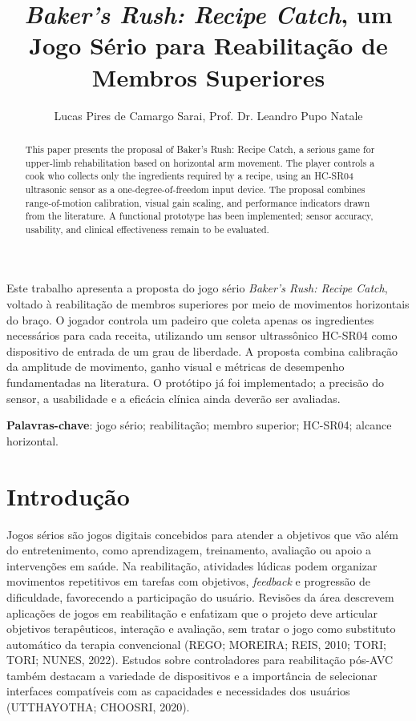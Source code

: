\documentclass[12pt]{article}
\title{\textit{Baker's Rush: Recipe Catch}, um Jogo Sério para Reabilitação de Membros Superiores}
\author{Lucas Pires de Camargo Sarai\inst{1}, Prof. Dr. Leandro Pupo Natale\inst{1}}
\begin{document}
\maketitle

\begin{abstract}
This paper presents the proposal of Baker's Rush: Recipe Catch, a serious game for upper-limb rehabilitation based on horizontal arm movement. The player controls a cook who collects only the ingredients required by a recipe, using an HC-SR04 ultrasonic sensor as a one-degree-of-freedom input device. The proposal combines range-of-motion calibration, visual gain scaling, and performance indicators drawn from the literature. A functional prototype has been implemented; sensor accuracy, usability, and clinical effectiveness remain to be evaluated.
\end{abstract}
\begin{resumo}
Este trabalho apresenta a proposta do jogo sério \textit{Baker's Rush: Recipe Catch}, voltado à reabilitação de membros superiores por meio de movimentos horizontais do braço. O jogador controla um padeiro que coleta apenas os ingredientes necessários para cada receita, utilizando um sensor ultrassônico HC-SR04 como dispositivo de entrada de um grau de liberdade. A proposta combina calibração da amplitude de movimento, ganho visual e métricas de desempenho fundamentadas na literatura. O protótipo já foi implementado; a precisão do sensor, a usabilidade e a eficácia clínica ainda deverão ser avaliadas.
\end{resumo}

\noindent\textbf{Palavras-chave}: jogo sério; reabilitação; membro superior; HC-SR04; alcance horizontal.

\section{Introdução}

Jogos sérios são jogos digitais concebidos para atender a objetivos que vão além do entretenimento, como aprendizagem, treinamento, avaliação ou apoio a intervenções em saúde. Na reabilitação, atividades lúdicas podem organizar movimentos repetitivos em tarefas com objetivos, \textit{feedback} e progressão de dificuldade, favorecendo a participação do usuário. Revisões da área descrevem aplicações de jogos em reabilitação e enfatizam que o projeto deve articular objetivos terapêuticos, interação e avaliação, sem tratar o jogo como substituto automático da terapia convencional (REGO; MOREIRA; REIS, 2010; TORI; TORI; NUNES, 2022). Estudos sobre controladores para reabilitação pós-AVC também destacam a variedade de dispositivos e a importância de selecionar interfaces compatíveis com as capacidades e necessidades dos usuários (UTTHAYOTHA; CHOOSRI, 2020).
\end{document}
